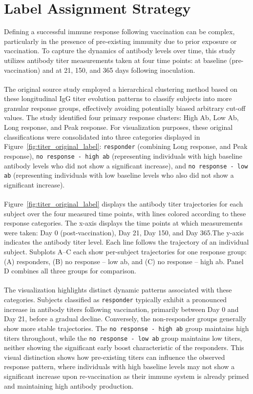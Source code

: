 \documentclass[12pt,a4paper]{report}
\begin{document}
\section{Label Assignment Strategy}
\noindent
Defining a successful immune response following vaccination can be complex, particularly in the presence of pre-existing immunity due to prior exposure or vaccination. To capture the dynamics of antibody levels over time, this study utilizes antibody titer measurements taken at four time points: at baseline (pre-vaccination) and at 21, 150, and 365 days following inoculation.\\
\\
The original source study \cite{bartholomeus2020transcriptomic} employed a hierarchical clustering method based on these longitudinal IgG titer evolution patterns to classify subjects into more granular response groups, effectively avoiding potentially biased arbitrary cut-off values. The study identified four primary response clusters: High Ab, Low Ab, Long response, and Peak response. For visualization purposes, these original classifications were consolidated into three categories displayed in Figure~\ref{fig:titer_original_label}: \texttt{responder} (combining Long response, and Peak response), \texttt{no response - high ab} (representing individuals with high baseline antibody levels who did not show a significant increase), and \texttt{no response - low ab} (representing individuals with low baseline levels who also did not show a significant increase).\\
\\
Figure~\ref{fig:titer_original_label} displays the antibody titer trajectories for each subject over the four measured time points, with lines colored according to these response categories. The x-axis displays the time points at which measurements were taken: Day 0 (post-vaccination), Day 21, Day 150, and Day 365.The y-axis indicates the antibody titer level. Each line follows the trajectory of an individual subject. Subplots A–C each show per-subject trajectories for one response group: (A) responders, (B) no response – low ab, and (C) no response – high ab. Panel D combines all three groups for comparison.\\
\\
The visualization highlights distinct dynamic patterns associated with these categories. Subjects classified as \texttt{responder} typically exhibit a pronounced increase in antibody titers following vaccination, primarily between Day 0 and Day 21, before a gradual decline. Conversely, the non-responder groups generally show more stable trajectories. The \texttt{no response - high ab} group maintains high titers throughout, while the \texttt{no response - low ab} group maintains low titers, neither showing the significant early boost characteristic of the responders. This visual distinction shows how pre-existing titers can influence the observed response pattern, where individuals with high baseline levels may not show a significant increase upon re-vaccination as their immune system is already primed and maintaining high antibody production.\\
\end{document}
